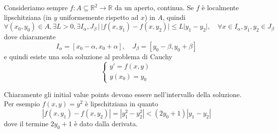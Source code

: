 \documentclass[a4paper]{article}
\begin{document}
Consideriamo sempre \(f\colon A \subseteq \mathbb{R}^2 \to \mathbb{R}\) da un aperto, continua.
Se \(f\) è localmente lipschitziana (in \(y\) uniformemente rispetto ad \(x\)) in \(A\),
quindi
\[
    \forall (x_0, y_0) \in A, \exists L > 0, \exists I_\alpha, J_\beta
    \,|\, |f(x,y_1) - f(x, y_2)| \leq L|y_1 - y_2|,
    \quad \forall x \in I_\alpha, y_1, y_2 \in J_\beta
\]
dove chiaramente
\[
    I_\alpha = [x_0 - \alpha, x_0 + \alpha], \quad
    J_\beta = [y_0 - \beta, y_0 + \beta]
\]
e quindi esiste una sola soluzione al problema di Cauchy
\[
    \begin{cases}
        y' = f(x,y) \\
        y(x_0) = y_0
    \end{cases}
\]

\pagebreak



Chiaramente gli initial value points devono essere nell'intervallo della soluzione.
Per esempio \(f(x,y) = y^2\) è lipschitziana in quanto
\[
    |f(x, y_1) - f(x, y_2)| = |y_1^2 - y_2^2| < (2y_0 + 1)|y_1 - y_2| 
\]
dove il termine \(2y_0+1\) è dato dalla derivata.

\end{document}
